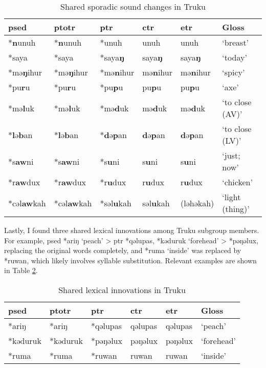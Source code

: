 \begin{table}[!hbtp]
\centering
\caption{Shared sporadic sound changes in Truku}
\label{tab:tr_sp}
\begin{tabular}{llllll}
\hline
\ac{psed}      & \ac{ptotr}   & \ac{ptr}     & \acs{ctr}   & \acs{etr}   & Gloss               \\ \hline
*\textbf{n}unuh  & *\textbf{n}unuh  & *unuh    & unuh    & unuh    & `breast'        \\
*saya   & *saya   & *saya\textbf{ŋ}   & saya\textbf{ŋ}   & saya\textbf{ŋ}   & `today'         \\
*mə\textbf{ŋ}ihur& *mə\textbf{ŋ}ihur& *mə\textbf{n}ihur & mə\textbf{n}ihur & mə\textbf{n}ihur & `spicy'        \\
*pu\textbf{r}u   & *pu\textbf{r}u   & *pu\textbf{p}u    & pu\textbf{p}u    & pu\textbf{p}u    & `axe'           \\
*mə\textbf{l}uk  & *mə\textbf{l}uk  & *mə\textbf{d}uk   & mə\textbf{d}uk   & mə\textbf{d}uk   & `to close (AV)' \\
*\textbf{l}ə\textbf{b}an  & *\textbf{l}ə\textbf{b}an  & *\textbf{d}ə\textbf{p}an   & \textbf{d}ə\textbf{p}an   & \textbf{d}ə\textbf{p}an   & `to close (LV)' \\ 
*s\textbf{aw}ni  & *s\textbf{aw}ni  & *s\textbf{u}ni    & s\textbf{u}ni    & s\textbf{u}ni    & `just; now'     \\
*r\textbf{aw}dux & *r\textbf{aw}dux & *r\textbf{u}dux   & r\textbf{u}dux   & r\textbf{u}dux   & `chicken'       \\ 
*cəl\textbf{aw}kah & *cəl\textbf{aw}kah & *səl\textbf{u}kah & səl\textbf{u}kah & (ləhəkah) & `light (thing)'\\ \hline
\end{tabular}
\end{table}

Lastly, I found three shared lexical innovations among Truku subgroup members. For example, \acl{psed} *ariŋ `peach' > \acl{ptr} *qəlupas, *kəduruk `forehead' > *pəŋəlux, replacing the original words completely, and *ruma `inside' was replaced by *ruwan, which likely involves syllable substitution. Relevant examples are shown in Table \ref{tab:tr_lx}.

\begin{table}[!hbtp]
\centering
\caption{Shared lexical innovations in Truku}
\label{tab:tr_lx}
\begin{tabular}{llllll}
\hline
\ac{psed}      & \ac{ptotr}   & \ac{ptr}     & \acs{ctr}   & \acs{etr}   & Gloss               \\ \hline
*ariŋ   & *ariŋ   & *qəlupas & qəlupas & qəlupas & `peach'         \\
*kəduruk& *kəduruk& *pəŋəlux & pəŋəlux & pəŋəlux & `forehead'      \\
*ruma  & *ruma   & *ruwan   & ruwan   & ruwan   & `inside'        \\ \hline
\end{tabular}
\end{table}

